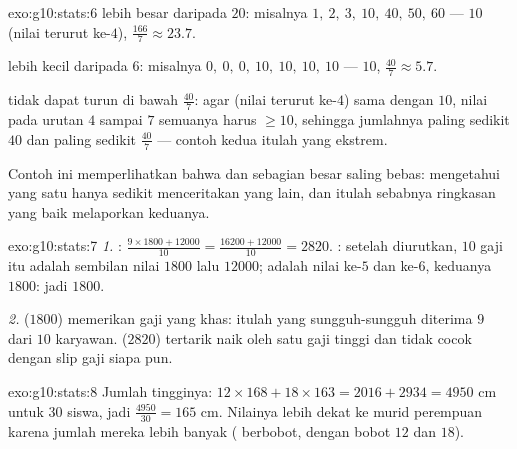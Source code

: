 \begin{solution}{exo:g10:stats:6}
 lebih besar daripada $20$: misalnya
$1,\ 2,\ 3,\ 10,\ 40,\ 50,\ 60$ ---  $10$ (nilai terurut ke-$4$),
 $\frac{166}{7} \approx 23.7$.

 lebih kecil daripada $6$: misalnya
$0,\ 0,\ 0,\ 10,\ 10,\ 10,\ 10$ ---  $10$, 
$\frac{40}{7} \approx 5.7$.

 tidak dapat turun di bawah $\frac{40}{7}$: agar  (nilai
terurut ke-$4$) sama dengan $10$, nilai pada urutan $4$ sampai $7$ semuanya
harus $\geq 10$, sehingga jumlahnya paling sedikit $40$ dan 
paling sedikit $\frac{40}{7}$ --- contoh kedua itulah yang ekstrem.

Contoh ini memperlihatkan bahwa  dan  sebagian besar saling
bebas: mengetahui yang satu hanya sedikit menceritakan yang lain, dan itulah
sebabnya ringkasan yang baik melaporkan keduanya.
\end{solution}

\begin{solution}{exo:g10:stats:7}
\emph{1.} :
$\frac{9 \times 1800 + 12000}{10} = \frac{16200 + 12000}{10} = 2820$.
: setelah diurutkan, $10$ gaji itu adalah sembilan nilai $1800$ lalu
$12000$;  adalah  nilai ke-$5$ dan ke-$6$, keduanya
$1800$: jadi  $1800$.

\emph{2.}  ($1800$) memerikan gaji yang khas: itulah yang
sungguh-sungguh diterima $9$ dari $10$ karyawan.  ($2820$) tertarik
naik oleh satu gaji tinggi dan tidak cocok dengan slip gaji siapa pun.
\end{solution}

\begin{solution}{exo:g10:stats:8}
Jumlah tingginya: $12 \times 168 + 18 \times 163 = 2016 + 2934 = 4950$ cm
untuk $30$ siswa, jadi  $\frac{4950}{30} = 165$ cm. Nilainya
lebih dekat ke  murid perempuan karena jumlah mereka lebih banyak
( berbobot, dengan bobot $12$ dan $18$).
\end{solution}

